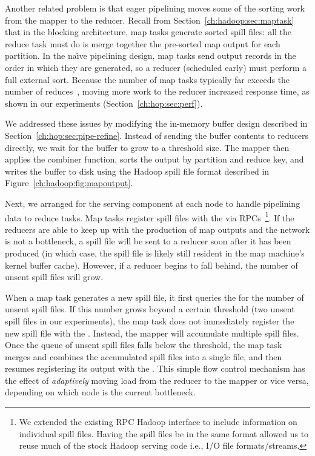 Another related problem is that eager pipelining moves some of the sorting work
from the mapper to the reducer.  Recall from
Section~\ref{ch:hadoop:sec:maptask} that in the blocking architecture, map
tasks generate sorted spill files: all the reduce task must do is merge
together the pre-sorted map output for each partition.  In the na\"{\i}ve
pipelining design, map tasks send output records in the order in which they are
generated, so a reducer (scheduled early) must perform a full external sort.
Because the number of map tasks typically far exceeds the number of
reduces~\cite{mapreduce-osdi}, moving more work to the reducer increased
response time, as shown in our experiments (Section~\ref{ch:hop:sec:perf}).

We addressed these issues by modifying the in-memory buffer design described in
Section~\ref{ch:hop:sec:pipe-refine}.  Instead of sending the buffer contents
to reducers directly, we wait for the buffer to grow to a threshold size.  The
mapper then applies the combiner function, sorts the output by partition and
reduce key, and writes the buffer to disk using the Hadoop spill file format
described in Figure~\ref{ch:hadoop:fig:mapoutput}.

Next, we arranged for the {\TT} serving component at each node to handle
pipelining data to reduce tasks.  Map tasks register spill files with the {\TT}
via RPCs~\footnote{We extended the existing RPC Hadoop interface to include
information on individual spill files.  Having the spill files be in the same
format allowed us to reuse much of the stock Hadoop serving code i.e., I/O file
formats/streams.}.  If the reducers are able to keep up with the production of
map outputs and the network is not a bottleneck, a spill file will be sent to a
reducer soon after it has been produced (in which case, the spill file is
likely still resident in the map machine's kernel buffer cache).  However, if a
reducer begins to fall behind, the number of unsent spill files will grow.

When a map task generates a new spill file, it first queries the {\TT} for the
number of unsent spill files.  If this number grows beyond a certain threshold
(two unsent spill files in our experiments), the map task does not immediately
register the new spill file with the {\TT}.  Instead, the mapper will
accumulate multiple spill files.  Once the queue of unsent spill files falls
below the threshold, the map task merges and combines the accumulated spill
files into a single file, and then resumes registering its output with the
{\TT}.  This simple flow control mechanism has the effect of \emph{adaptively}
moving load from the reducer to the mapper or vice versa, depending on which
node is the current bottleneck.

